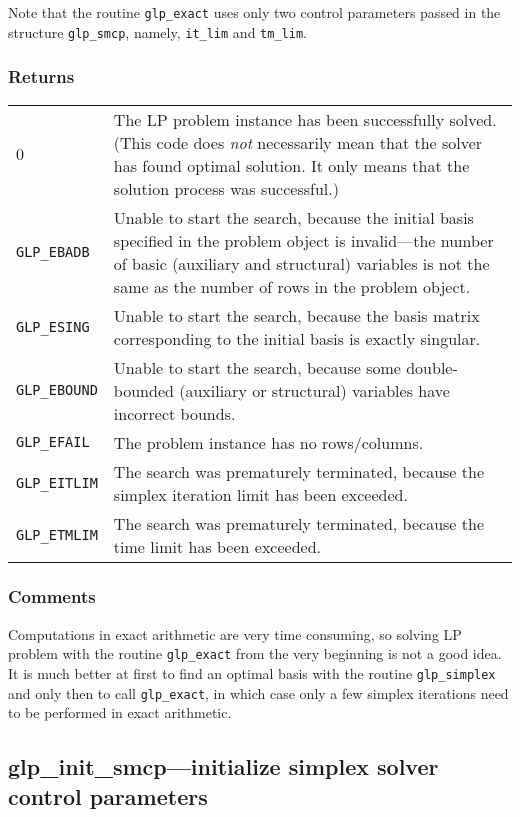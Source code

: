 Note that the routine \verb|glp_exact| uses only two control parameters
passed in the structure \verb|glp_smcp|, namely, \verb|it_lim| and
\verb|tm_lim|.

\subsubsection*{Returns}

\def\arraystretch{1}

\begin{tabular}{@{}p{25mm}p{97.3mm}@{}}
0 & The LP problem instance has been successfully solved. (This code
does {\it not} necessarily mean that the solver has found optimal
solution. It only means that the solution process was successful.) \\
\verb|GLP_EBADB| & Unable to start the search, because the initial basis
specified in the problem object is invalid---the number of basic
(auxiliary and structural) variables is not the same as the number of
rows in the problem object.\\
\verb|GLP_ESING| & Unable to start the search, because the basis matrix
corresponding to the initial basis is exactly singular.\\
\verb|GLP_EBOUND| & Unable to start the search, because some
double-bounded (auxiliary or structural) variables have incorrect
bounds.\\
\verb|GLP_EFAIL| & The problem instance has no rows/columns.\\
\verb|GLP_EITLIM| & The search was prematurely terminated, because the
simplex iteration limit has been exceeded.\\
\verb|GLP_ETMLIM| & The search was prematurely terminated, because the
time limit has been exceeded.\\
\end{tabular}

\subsubsection*{Comments}

Computations in exact arithmetic are very time consuming, so solving
LP problem with the routine \verb|glp_exact| from the very beginning is
not a good idea. It is much better at first to find an optimal basis
with the routine \verb|glp_simplex| and only then to call
\verb|glp_exact|, in which case only a few simplex iterations need to
be performed in exact arithmetic.

\subsection{glp\_init\_smcp---initialize simplex solver control
parameters}

